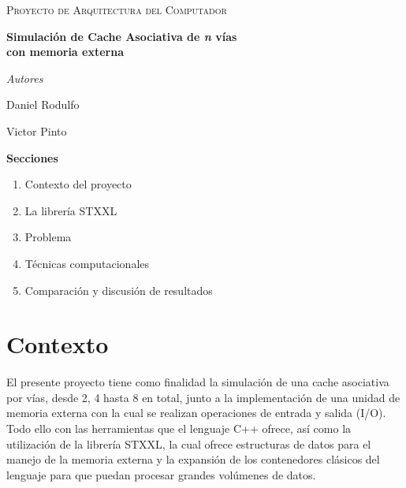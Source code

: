 \documentclass[11pt,letterpaper]{article}
\begin{document}
\begin{titlepage}
    \centering
    \vspace*{2cm}

    {\scshape\large Proyecto de Arquitectura del Computador\par}
    \vspace{1.5cm}

    {\Huge\bfseries Simulación de Cache Asociativa de \textit{n} vías\\[0.3cm] con memoria externa\par}

    \vspace{3cm}

    {\large\itshape Autores\par}
    \vspace{0.5cm}
    {\large Daniel Rodulfo\par}
    {\large Victor Pinto\par}

    \vfill

    {\large\bfseries Secciones\par}
    \vspace{0.5cm}
    \begin{enumerate}[leftmargin=2.2cm, label=\arabic*.]
        \item Contexto del proyecto
        \item La librería STXXL
        \item Problema
        \item Técnicas computacionales
        \item Comparación y discusión de resultados
    \end{enumerate}

    \vspace{1.5cm}
\end{titlepage}

\section*{Contexto}

El presente proyecto tiene como finalidad la simulación de una cache asociativa por vías, desde 2, 4 hasta 8 en total, junto a la implementación de una unidad de memoria externa con la cual se realizan operaciones de entrada y salida (I/O). Todo ello con las herramientas que el lenguaje C++ ofrece, así como la utilización de la librería STXXL, la cual ofrece estructuras de datos para el manejo de la memoria externa y la expansión de los contenedores clásicos del lenguaje para que puedan procesar grandes volúmenes de datos.
\end{document}
